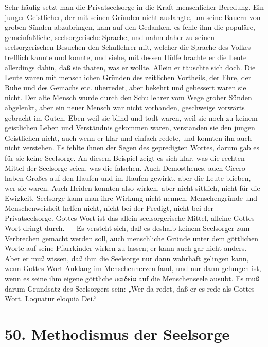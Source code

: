Sehr häufig setzt man die Privatseelsorge in die Kraft menschlicher Beredung. Ein junger Geistlicher, der mit seinen Gründen nicht auslangte, um seine Bauern von groben Sünden abzubringen, kam auf den Gedanken, es fehle ihm die populäre, gemeinfaßliche, seelsorgerische Sprache, und nahm daher zu seinen seelsorgerischen Besuchen den Schullehrer mit, welcher die Sprache des Volkes trefflich kannte und konnte, und siehe, mit dessen Hülfe brachte er die Leute allerdings dahin, daß sie thaten, was er wollte. Allein er täuschte sich doch. Die Leute waren mit menschlichen Gründen des zeitlichen Vortheils, der Ehre, der Ruhe und des Gemachs etc. überredet, aber bekehrt und gebessert waren sie nicht. Der alte Mensch wurde durch den Schullehrer vom Wege grober
Sünden abgelenkt, aber ein neuer Mensch war nicht vorhanden, geschweige vorwärts gebracht im Guten. Eben weil sie blind und todt waren, weil sie noch zu keinem geistlichen Leben und Verständnis gekommen waren, verstanden sie den jungen Geistlichen nicht, auch wenn er klar und einfach redete, und konnten ihn auch nicht verstehen. Es fehlte ihnen der Segen des gepredigten Wortes, darum gab es für sie keine Seelsorge. An diesem Beispiel zeigt es sich klar, was die rechten Mittel der Seelsorge seien, was die falschen. Auch Demosthenes, auch Cicero haben Großes auf den Haufen und im Haufen gewirkt, aber die Leute blieben, wer sie waren. Auch Heiden konnten also wirken, aber nicht sittlich, nicht für die Ewigkeit. Seelsorge kann man ihre Wirkung nicht nennen. Menschengründe und Menschenweisheit helfen nicht, nicht bei der Predigt, nicht bei der Privatseelsorge. Gottes Wort ist das allein seelsorgerische Mittel, alleine Gottes Wort dringt durch. — Es versteht sich, daß es deshalb keinem Seelsorger zum Verbrechen gemacht werden soll, auch menschliche Gründe unter dem göttlichen Worte auf seine Pfarrkinder wirken zu lassen; er kann auch gar nicht anders. Aber er muß wissen, daß ihm die Seelsorge nur dann wahrhaft gelingen kann, wenn Gottes Wort Anklang im Menschenherzen fand, und nur dann gelungen ist, wenn es seine ihm eigene göttliche παιδεία auf die Menschenseele ausübt. Es muß darum Grundsatz des Seelsorgers sein: „Wer da redet, daß er es rede als Gottes Wort. Loquatur eloquia Dei.“

\section{50. Methodismus der Seelsorge}

